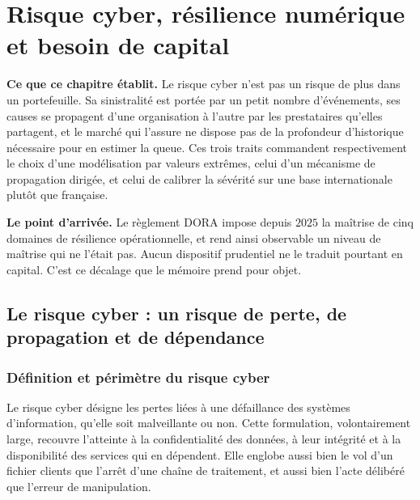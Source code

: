 \chapter{Risque cyber, résilience numérique et besoin de capital}
\label{chap:cadre-cyber-dora}

\begin{cle}
\textbf{Ce que ce chapitre établit.} Le risque cyber n'est pas un risque de plus dans un
portefeuille. Sa sinistralité est portée par un petit nombre d'événements, ses causes se
propagent d'une organisation à l'autre par les prestataires qu'elles partagent, et le marché
qui l'assure ne dispose pas de la profondeur d'historique nécessaire pour en estimer la queue.
Ces trois traits commandent respectivement le choix d'une modélisation par valeurs extrêmes,
celui d'un mécanisme de propagation dirigée, et celui de calibrer la sévérité sur une base
internationale plutôt que française.

\textbf{Le point d'arrivée.} Le règlement DORA impose depuis $2025$ la maîtrise de cinq domaines
de résilience opérationnelle, et rend ainsi observable un niveau de maîtrise qui ne l'était pas.
Aucun dispositif prudentiel ne le traduit pourtant en capital. C'est ce décalage que le mémoire
prend pour objet.
\end{cle}


\section{Le risque cyber : un risque de perte, de propagation et de dépendance}
\label{sec:risque-cyber}

\subsection{Définition et périmètre du risque cyber}
\label{subsec:definition-cyber}

Le risque cyber désigne les pertes liées à une défaillance des systèmes d'information, qu'elle
soit malveillante ou non. Cette formulation, volontairement large, recouvre l'atteinte à la
confidentialité des données, à leur intégrité et à la disponibilité des services qui en
dépendent. Elle englobe aussi bien le vol d'un fichier clients que l'arrêt d'une chaîne de
traitement, et aussi bien l'acte délibéré que l'erreur de manipulation.

